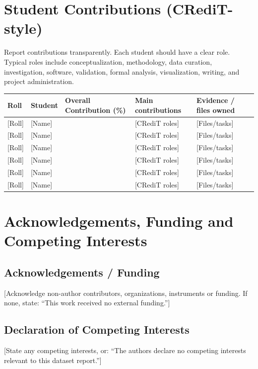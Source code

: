 \documentclass[11pt,a4paper]{article}
\begin{document}
\vspace{1.5em}

\section{Student Contributions (CRediT-style)}
Report contributions transparently. Each student should have a clear role. Typical roles include conceptualization, methodology, data curation, investigation, software, validation, formal analysis, visualization, writing, and project administration.

\vspace{0.5em}

\noindent
\begin{tabularx}{\textwidth}{|p{1.8cm}|p{3cm}|p{2.5cm}|X|p{3.2cm}|}
\hline
\textbf{Roll} & \textbf{Student} & \textbf{Overall Contribution (\%)} & \textbf{Main contributions} & \textbf{Evidence / files owned} \\
\hline
{[Roll]} & [Name] & & [CRediT roles] & [Files/tasks] \\
\hline
{[Roll]} & [Name] & & [CRediT roles] & [Files/tasks] \\
\hline
{[Roll]} & [Name] & & [CRediT roles] & [Files/tasks] \\
\hline
{[Roll]} & [Name] & & [CRediT roles] & [Files/tasks] \\
\hline
{[Roll]} & [Name] & & [CRediT roles] & [Files/tasks] \\
\hline
{[Roll]} & [Name] & & [CRediT roles] & [Files/tasks] \\
\hline
\end{tabularx}

\vspace{1.5em}

\section{Acknowledgements, Funding and Competing Interests}
\subsection{Acknowledgements / Funding}
[Acknowledge non-author contributors, organizations, instruments or funding. If none, state: ``This work received no external funding.'']

\subsection{Declaration of Competing Interests}
[State any competing interests, or: ``The authors declare no competing interests relevant to this dataset report.'']
\end{document}
